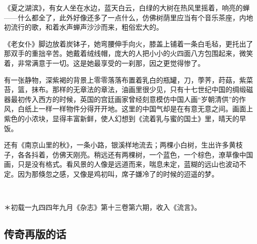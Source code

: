\par 《夏之湖滨》，有女人坐在水边，蓝天白云，白绿的大树在热风里摇着，响亮的蝉——什么都全了，此外好像还多了一点什么，仿佛树荫里应当有个音乐茶座，内地初流行的歌，和着水声蝉声沙沙而来，粗俗宏大的。
\par 《老女仆》脚边放着炭钵子，她弯腰伸手向火，膝盖上铺着一条白毛毡，更托出了那双手的重拙辛苦。她戴着绒线帽，庞大的人把小小的火四面八方包围起来，微笑着，非常满意于一切。这是她最享受的一刹那，因之更觉得惨了。
\par 有一张静物，深紫褐的背景上零零落落布置着乳白的瓶罐，刀，荸荠，莳菇，紫菜苔，篮，抹布。那样的无章法的章法，油画里很少见，只有十七世纪中国的绸缎磁器最初传入西方的时候，英国的宫廷画家曾经刻意模仿中国人画“岁朝清供”的作风，白纸上一样一样物件分得开开地。这里的中国气却是在有意无意之间。画面上紫色的小浓块，显得丰富新鲜，使人幻想到《流着乳与蜜的国土》里，晴天的早饭。
\par 还有《南京山里的秋》，一条小路，银溪样地流去；两棵小白树，生出许多黄枝子，各各抖着，仿佛天刚亮。稍远还有两棵树，一个蓝色，一个棕色，潦草像中国画，只是没有格式。看风景的人像是远道而来，喘息未定，蓝糊的远山也波动不定。因为那倏忽之感，又像是鸡初叫，席子嫌冷了的时候的迢遥的梦。
\par  
\par ＊初载一九四四年九月《杂志》第十三卷第六期，收入《流言》。


\subsection{传奇再版的话}

